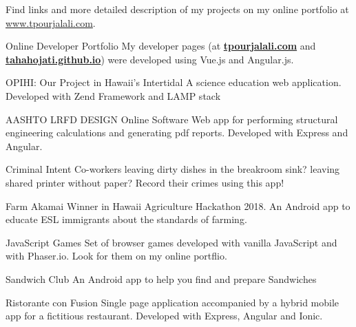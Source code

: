 
	Find links and more detailed description of my projects on my online portfolio at \mbox{\href{http://www.tpourjalali.com}{www.tpourjalali.com}}.
\begin{cventries}
	
	\cventry
	{\faLaptop\enspace Online Developer Portfolio}
	{}
	{}
	{}
	{My developer pages (at \textbf{\href{http://www.tpourjalali.com}{tpourjalali.com}} and \textbf{\href{https://tahahojati.github.io}{ tahahojati.github.io}}) were developed using Vue.js and Angular.js. }
	
	\cventry
	{\faLaptop \enspace OPIHI: Our Project in Hawaii's Intertidal}
	{}
	{}
	{}
	{A science education web application. Developed with Zend Framework and LAMP stack}
	
	\cventry
	{\faLaptop\enspace AASHTO LRFD DESIGN Online Software}
	{}
	{}
	{}
	{Web app for performing structural engineering calculations and generating pdf reports. Developed with Express and Angular. }
	
	
	
	\cventry
	{\faAndroid\enspace Criminal Intent}
	{}
	{}
	{}
	{Co-workers leaving dirty dishes in the breakroom sink? leaving shared printer without paper? Record their crimes using this app!}

	
	
	\cventry
	{\faTrophy\faAndroid\enspace Farm Akamai}
	{}
	{}
	{}
	{Winner in Hawaii Agriculture Hackathon 2018. An Android app to educate ESL immigrants about the standards of farming.}

	\cventry
	{\faChrome\enspace JavaScript Games}
	{}
	{}
	{}
	{Set of browser games developed with vanilla JavaScript and with Phaser.io. Look for them on my online portflio.}
	
	\cventry
	{\faAndroid\enspace Sandwich Club}
	{}
	{}
	{}
	{An Android app to help you find and prepare Sandwiches}
			
	
	\cventry
	{\faAndroid \faLaptop\enspace Ristorante con Fusion
	}
	{}
	{}
	{}
	{Single page application accompanied by a hybrid mobile app for a fictitious restaurant. Developed with Express, Angular and Ionic.}
	

\end{cventries}
